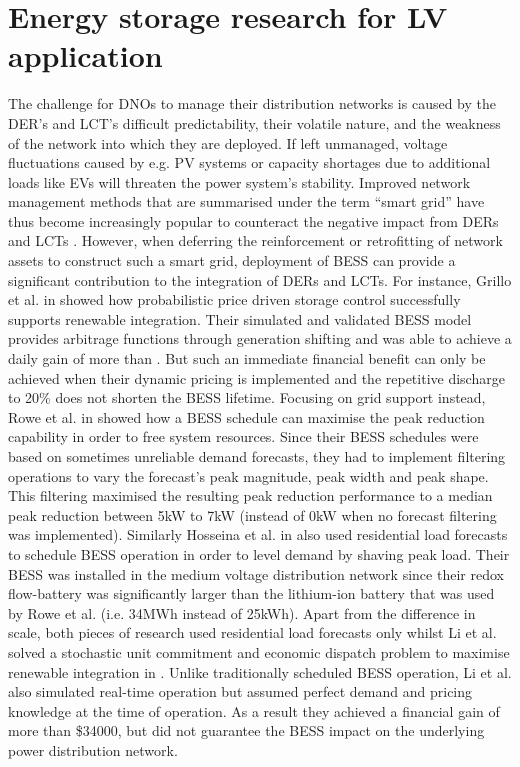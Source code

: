 \section{Energy storage research for LV application}
\label{ch-literature:sec:energy-storage}

The challenge for DNOs to manage their distribution networks is caused by the DER's and LCT's difficult predictability, their volatile nature, and the weakness of the network into which they are deployed.
If left unmanaged, voltage fluctuations caused by e.g. PV systems \cite{Woyte2006, Bravo2015} or capacity shortages due to additional loads like EVs \cite{Mohd2008a, Koureoumpezis2010} will threaten the power system's stability.
Improved network management methods that are summarised under the term ``smart grid'' have thus become increasingly popular to counteract the negative impact from DERs and LCTs \cite{Panteli2015}.
However, when deferring the reinforcement or retrofitting of network assets to construct such a smart grid, deployment of BESS can provide a significant contribution to the integration of DERs and LCTs.
For instance, Grillo et al. in \cite{Grillo2012} showed how probabilistic price driven storage control successfully supports renewable integration.
Their simulated and validated BESS model provides arbitrage functions through generation shifting and was able to achieve a daily gain of more than .
But such an immediate financial benefit can only be achieved when their dynamic pricing is implemented and the repetitive discharge to 20\% does not shorten the BESS lifetime.
Focusing on grid support instead, Rowe et al. in \cite{Rowe2014a} showed how a BESS schedule can maximise the peak reduction capability in order to free system resources.
Since their BESS schedules were based on sometimes unreliable demand forecasts, they had to implement filtering operations to vary the forecast's peak magnitude, peak width and peak shape.
This filtering maximised the resulting peak reduction performance to a median peak reduction between 5kW to 7kW (instead of 0kW when no forecast filtering was implemented).
Similarly Hosseina et al. in \cite{Hosseina2016a} also used residential load forecasts to schedule BESS operation in order to level demand by shaving peak load.
Their BESS was installed in the medium voltage distribution network since their redox flow-battery was significantly larger than the lithium-ion battery that was used by Rowe et al. (i.e. 34MWh instead of 25kWh).
Apart from the difference in scale, both pieces of research used residential load forecasts only whilst Li et al. solved a stochastic unit commitment and economic dispatch problem to maximise renewable integration in \cite{Li2016}.
Unlike traditionally scheduled BESS operation, Li et al. also simulated real-time operation but assumed perfect demand and pricing knowledge at the time of operation.
As a result they achieved a financial gain of more than \$34000, but did not guarantee the BESS impact on the underlying power distribution network.

